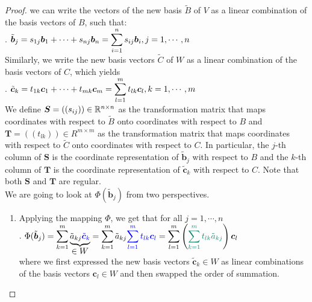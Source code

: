 \begin{enumerate}
    \begin{proof}
        we can write the vectors of the new basis $\tilde{B}$ of $V$ as a linear combination of the basis vectors of $B$, such that:
        \hfill \cite{mfml/book/mml/Deisenroth-Faisal-Ong}
        \\
        .\hfill
        $
            \tilde{\bm{b}}_j
            = s_{1j} \bm{b}_1 + \cdots + s_{nj} \bm{b}_n
            = \displaystyle\sum^n _{i=1} s_{ij} \bm{b}_i
            , j = 1, \cdots , n
        $
        \hfill \cite{mfml/book/mml/Deisenroth-Faisal-Ong}
        \\
        Similarly, we write the new basis vectors $\tilde{C}$ of $W$ as a linear combination of the basis vectors of $C$, which yields
        \hfill \cite{mfml/book/mml/Deisenroth-Faisal-Ong}
        \\
        .\hfill
        $
            \tilde{\bm{c}}_k
            = t_{1k} \bm{c}_1 + \cdots + t_{mk} \bm{c}_m
            = \displaystyle\sum^m _{l=1} t_{lk} \bm{c}_l
            , k = 1, \cdots , m
        $
        \hfill \cite{mfml/book/mml/Deisenroth-Faisal-Ong}
        \\
        We define $\bm{S} = ((s_{ij} )) \in \mathbb{R}^{n\times n}$ as the transformation matrix that maps coordinates with respect to $\tilde{B}$ onto coordinates with respect to $B$ and $\bm{T} = ((t_{lk})) \in R^{m\times m}$ as the transformation matrix that maps coordinates with respect to $\tilde{C}$ onto coordinates with respect to $C$.
        In particular, the $j$-th column of $\bm{S}$ is the coordinate representation of $\tilde{\bm{b}}_j$ with respect to $B$ and the $k$-th column of $\bm{T}$ is the coordinate representation of $\tilde{\bm{c}}_k$ with respect to $C$.
        Note that both $\bm{S}$ and $\bm{T}$ are regular.
        \hfill \cite{mfml/book/mml/Deisenroth-Faisal-Ong}
        \\
        We are going to look at $\Phi(\tilde{\bm{b}}_j )$ from two perspectives.
        \hfill \cite{mfml/book/mml/Deisenroth-Faisal-Ong}
        \begin{enumerate}
            \item Applying the mapping $\Phi$, we get that for all $j = 1, \cdots , n$
            \hfill \cite{mfml/book/mml/Deisenroth-Faisal-Ong}
            \\
            .\hfill
            $
                \Phi(\tilde{\bm{b}}_j )
                = \dsum^m_{k=1} \underset{\displaystyle \in W}{
                    \underbrace{\tilde{a}_{kj} \textcolor{blue}{\tilde{\bm{c}}_k}}
                }
                = \dsum^m_{k=1} \tilde{a}_{kj} \textcolor{blue}{
                    \dsum^m_{l=1} t_{lk} \bm{c}_l
                }
                = \dsum^m_{l=1} \dParenBrac{
                    \textcolor{PineGreen}{\dsum^m_{k=1} t_{lk} \tilde{a}_{kj}}
                }  \bm{c}_l
            $
            \hfill \cite{mfml/book/mml/Deisenroth-Faisal-Ong}
            \\
            where we first expressed the new basis vectors $\tilde{\bm{c}}_k \in W$ as linear combinations of the basis vectors $\bm{c}_l \in W$ and then swapped the order of summation.
            \hfill \cite{mfml/book/mml/Deisenroth-Faisal-Ong}



\end{enumerate}
\end{proof}
\end{enumerate}
